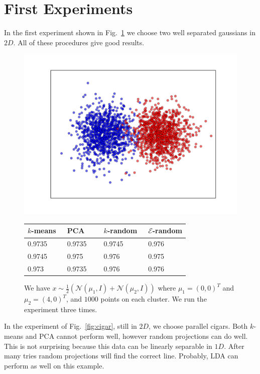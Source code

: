 \documentclass[aps,preprint,nofootinbib,floatfix]{revtex4-1}
\begin{document}
\section{First Experiments}

In the first experiment shown in Fig.~\ref{fig:2d_gauss_sep} we choose
two well separated gaussians in $2D$. All of these procedures give good
results.

\begin{figure}
\begin{minipage}{.49\textwidth}
\includegraphics[scale=.45]{2d_gauss_separate.pdf}
\end{minipage}
\begin{minipage}{.49\textwidth}
\begin{tabular}{ l  l  l l}
\hline
$k$-means~ & PCA~~~ & $k$-random~ & $\mathcal{E}$-random \\
\hline
0.9735 &
0.9735 &
0.9745 &
0.976 \\
%
0.9745 &
0.975 &
0.976 &
0.975 \\
%
0.973 &
0.9735 & 
0.976 &
0.976 \\
%
\hline
\end{tabular}
\end{minipage}
\caption{\label{fig:2d_gauss_sep}
We have $x \sim \tfrac{1}{2}\left( \mathcal{N}(\mu_1, I) +
\mathcal{N}(\mu_2, I)\right)$ where $\mu_1 = (0,0)^T$ and $\mu_2=(4,0)^T$,
and $1000$ points on each cluster. We run the experiment three times.
}
\end{figure}

In the experiment of Fig.~\ref{fig:cigar}, still in $2D$, we choose
parallel cigars. Both $k$-means and PCA cannot perform well, however random
projections can do well. This is not surprising because this data
can be linearly separable in $1D$. After many tries random projections will
find the correct line. Probably, LDA can perform as well on this example.
\end{document}
